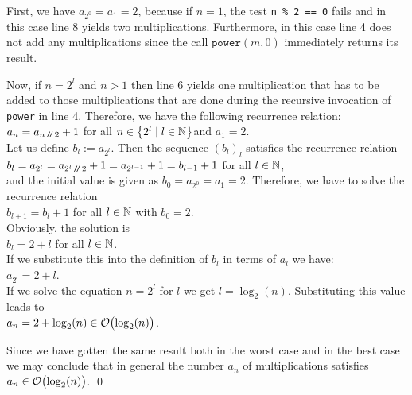 First, we have $a_{2^0} = a_1 = 2$, because if $n = 1$, the test \texttt{n \% 2 == 0} fails and in
this case line 8 yields two multiplications.  Furthermore, in this case
line 4 does not add any multiplications since the call $\mathtt{power}(m,0)$ immediately returns its
result.

Now, if $n = 2^l$ and $n > 1$ then line 6 yields one multiplication that 
has to be added to those multiplications that are done during the recursive invocation of
\texttt{power} in line 4.  Therefore, we have the following recurrence relation:
 \\[0.2cm]
\hspace*{1.3cm} $a_n = a_{n \mbox{\scriptsize\,\texttt{/}$\!$\texttt{/}\,} 2} + 1$ \qquad for all $n \in \left\{2^l \mid l \in {\mathbb N}\right\}$\quad and
$a_1 = 2$. 
\\[0.2cm]
Let us define $b_l := a_{2^l}$.  Then the sequence $(b_l)_l$ satisfies the recurrence relation
 \\[0.2cm]
\hspace*{1.3cm} 
$b_l = a_{2^l} = a_{2^l \mbox{\scriptsize\,\texttt{/}$\!$\texttt{/}\,} 2} + 1 = a_{2^{l-1}} + 1 = b_{l-1} + 1$ \qquad for all $l\in{\mathbb N}$, \\[0.2cm]
and the initial value is given as $b_0 = a_{2^0} = a_1 = 2$.
Therefore, we have to solve the recurrence relation 
\\[0.2cm]
\hspace*{1.3cm}
 $b_{l+1} = b_l + 1$ \qquad for all $l \in {\mathbb N}$ \quad with $b_0 = 2$.\\[0.2cm]
Obviously, the solution is \\[0.2cm]
\hspace*{1.3cm} $b_l = 2 + l$ \qquad for all $l\in{\mathbb N}$.
\\[0.2cm]
If we substitute this into the definition of $b_l$ in terms of $a_l$ we have: \\[0.2cm]
\hspace*{1.3cm}
$a_{2^l} = 2 + l$. 
\\[0.2cm]
If we solve the equation $n = 2^l$ for  $l$ we get $l =
\log_2(n)$. Substituting this value leads to
\\[0.2cm]
\hspace*{1.3cm}
 $a_n = 2 + \log_2(n) \in \mathcal{O}\bigl(\log_2(n)\bigr)$.
\vspace*{0.3cm}

Since we have gotten the same result both in the worst case and in the best case we may conclude
that in general the number $a_n$ of multiplications satisfies 
\\[0.2cm]
\hspace*{1.3cm} 
$a_n \in \mathcal{O}\bigl(\log_2(n)\bigr)$. \qed

